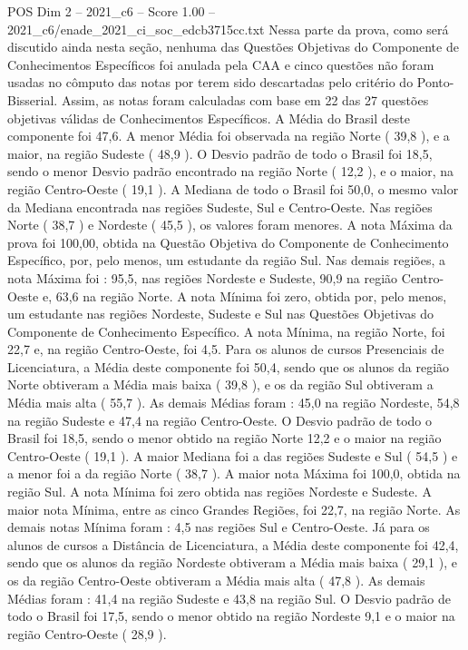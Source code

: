 \begin{textsample}{POS Dim 2 – 2021\_c6 – Score 1.00 – 2021\_c6/enade\_2021\_ci\_soc\_edcb3715cc.txt}
Nessa parte da prova, como será discutido ainda nesta seção, nenhuma das Questões Objetivas do Componente de Conhecimentos Específicos foi anulada pela CAA e cinco questões não foram usadas no cômputo das notas por terem sido descartadas pelo critério do Ponto-Bisserial.
Assim, as notas foram calculadas com base em 22 das 27 questões objetivas válidas de Conhecimentos Específicos.
A Média do Brasil deste componente foi 47,6.
A menor Média foi observada na região Norte ( 39,8 ), e a maior, na região Sudeste ( 48,9 ).
O Desvio padrão de todo o Brasil foi 18,5, sendo o menor Desvio padrão encontrado na região Norte ( 12,2 ), e o maior, na região Centro-Oeste ( 19,1 ).
A Mediana de todo o Brasil foi 50,0, o mesmo valor da Mediana encontrada nas regiões Sudeste, Sul e Centro-Oeste.
Nas regiões Norte ( 38,7 ) e Nordeste ( 45,5 ), os valores foram menores.
A nota Máxima da prova foi 100,00, obtida na Questão Objetiva do Componente de Conhecimento Específico, por, pelo menos, um estudante da região Sul.
Nas demais regiões, a nota Máxima foi : 95,5, nas regiões Nordeste e Sudeste, 90,9 na região Centro-Oeste e, 63,6 na região Norte.
A nota Mínima foi zero, obtida por, pelo menos, um estudante nas regiões Nordeste, Sudeste e Sul nas Questões Objetivas do Componente de Conhecimento Específico.
A nota Mínima, na região Norte, foi 22,7 e, na região Centro-Oeste, foi 4,5.
Para os alunos de cursos Presenciais de Licenciatura, a Média deste componente foi 50,4, sendo que os alunos da região Norte obtiveram a Média mais baixa ( 39,8 ), e os da região Sul obtiveram a Média mais alta ( 55,7 ).
As demais Médias foram : 45,0 na região Nordeste, 54,8 na região Sudeste e 47,4 na região Centro-Oeste.
O Desvio padrão de todo o Brasil foi 18,5, sendo o menor obtido na região Norte 12,2 e o maior na região Centro-Oeste ( 19,1 ).
A maior Mediana foi a das regiões Sudeste e Sul ( 54,5 ) e a menor foi a da região Norte ( 38,7 ).
A maior nota Máxima foi 100,0, obtida na região Sul.
A nota Mínima foi zero obtida nas regiões Nordeste e Sudeste.
A maior nota Mínima, entre as cinco Grandes Regiões, foi 22,7, na região Norte.
As demais notas Mínima foram : 4,5 nas regiões Sul e Centro-Oeste.
Já para os alunos de cursos a Distância de Licenciatura, a Média deste componente foi 42,4, sendo que os alunos da região Nordeste obtiveram a Média mais baixa ( 29,1 ), e os da região Centro-Oeste obtiveram a Média mais alta ( 47,8 ).
As demais Médias foram : 41,4 na região Sudeste e 43,8 na região Sul.
O Desvio padrão de todo o Brasil foi 17,5, sendo o menor obtido na região Nordeste 9,1 e o maior na região Centro-Oeste ( 28,9 ).

\end{textsample}

